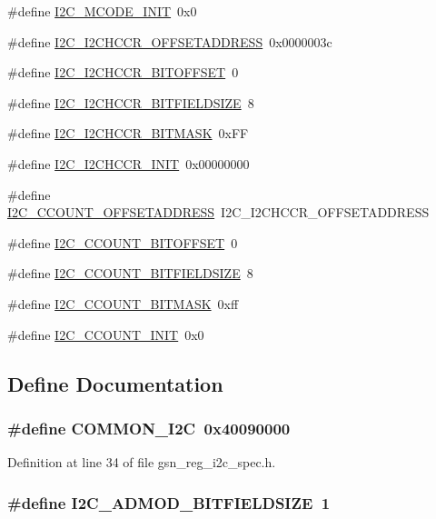 \begin{DoxyCompactItemize}
\item 
\#define \hyperlink{a00558_ab9511a7c6cf9c37f6f753bd7f33ab966}{I2C\_\-MCODE\_\-INIT}~0x0
\item 
\#define \hyperlink{a00558_a26ec2c9f9b5e9e0de8f02017e3fcf845}{I2C\_\-I2CHCCR\_\-OFFSETADDRESS}~0x0000003c
\item 
\#define \hyperlink{a00558_a6bcb89e6e880c0b0b650457e29f7a1df}{I2C\_\-I2CHCCR\_\-BITOFFSET}~0
\item 
\#define \hyperlink{a00558_aec9dff7425ac731dde79158928955bd5}{I2C\_\-I2CHCCR\_\-BITFIELDSIZE}~8
\item 
\#define \hyperlink{a00558_af0f236970ad913e5edb3ffd4962f2ddc}{I2C\_\-I2CHCCR\_\-BITMASK}~0xFF
\item 
\#define \hyperlink{a00558_abcebfae28ba4bb045cdc7d624bc89019}{I2C\_\-I2CHCCR\_\-INIT}~0x00000000
\item 
\#define \hyperlink{a00558_adc7b5d6827dd7a61f8a384af4e0efa2b}{I2C\_\-CCOUNT\_\-OFFSETADDRESS}~I2C\_\-I2CHCCR\_\-OFFSETADDRESS
\item 
\#define \hyperlink{a00558_a24dc1fbcfd5227e6bf53e9902149a065}{I2C\_\-CCOUNT\_\-BITOFFSET}~0
\item 
\#define \hyperlink{a00558_a6af3a20aab2e1911c5984390e37e9063}{I2C\_\-CCOUNT\_\-BITFIELDSIZE}~8
\item 
\#define \hyperlink{a00558_a8ab61e97ce14317b4f30cc745ad834a4}{I2C\_\-CCOUNT\_\-BITMASK}~0xff
\item 
\#define \hyperlink{a00558_a60573ffe8dacd89636a89dc2c17181d9}{I2C\_\-CCOUNT\_\-INIT}~0x0
\end{DoxyCompactItemize}


\subsection{Define Documentation}
\hypertarget{a00558_a6314807e922d0da7c37bc8441607a868}{
\subsubsection[{COMMON\_\-I2C}]{\setlength{\rightskip}{0pt plus 5cm}\#define COMMON\_\-I2C~0x40090000}}
\label{a00558_a6314807e922d0da7c37bc8441607a868}


Definition at line 34 of file gsn\_\-reg\_\-i2c\_\-spec.h.

\hypertarget{a00558_ae3ecf6672c93accfe0e62c927e91d19a}{
\subsubsection[{I2C\_\-ADMOD\_\-BITFIELDSIZE}]{\setlength{\rightskip}{0pt plus 5cm}\#define I2C\_\-ADMOD\_\-BITFIELDSIZE~1}}
\label{a00558_ae3ecf6672c93accfe0e62c927e91d19a}


